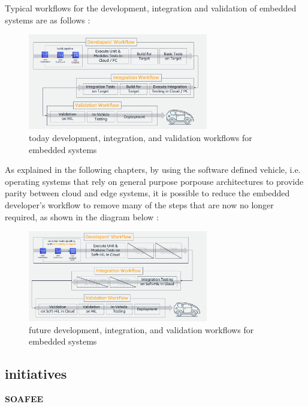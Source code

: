 Typical workflows for the development, integration and validation of embedded systems are as follows \cite{DevelopersWorkflow}:
\begin{figure}[h]  %
    \centering
    \includegraphics[width=0.7\textwidth]{images/today_developer_workflow.png}  %
    \caption{today development, integration, and validation workflows for embedded systems}
    \label{fig:TodayDeveloperWorkflow}
\end{figure}

As explained in the following chapters, by using the software defined vehicle, i.e. operating systems that rely on general purpose porpouse architectures to provide parity between cloud and edge systems, it is possible to reduce the embedded developer's workflow to remove many of the steps that are now no longer required, as shown in the diagram below \cite{DevelopersWorkflow}:
\begin{figure}[h]  %
    \centering
    \includegraphics[width=0.7\textwidth]{images/future_developers_workflow.png}  %
    \caption{future development, integration, and validation workflows for embedded systems}
    \label{fig:FutureDevelopersWorkflow}
\end{figure}

\subsection{initiatives}
\textbf{SOAFEE}

